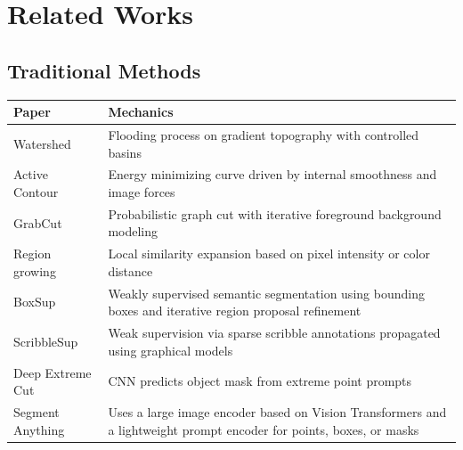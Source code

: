 \chapter{Related Works}
\label{Chapter2}
\section{Traditional Methods}
\begin{table}[H]
	\centering
	\begin{tabular}{|l|p{12cm}|}
		\hline
		{\textbf{Paper}} & {\textbf{Mechanics}} \\ \hline
		Watershed &
		Flooding process on gradient topography with controlled basins \\ \hline
		Active Contour &
		Energy minimizing curve driven by internal smoothness and image forces \\ \hline
		GrabCut &
		Probabilistic graph cut with iterative foreground background modeling \\ \hline
		Region growing &
		Local similarity expansion based on pixel intensity or color distance \\ \hline
		BoxSup           & Weakly supervised semantic segmentation using bounding boxes and iterative region proposal refinement                 \\ \hline
		ScribbleSup      & Weak supervision via sparse scribble annotations propagated using graphical models \\ \hline
		Deep Extreme Cut & CNN predicts object mask from extreme point prompts                                \\ \hline
		Segment Anything & Uses a large image encoder based on Vision Transformers and a lightweight prompt encoder for points, boxes, or masks \\ \hline
	\end{tabular}
\end{table}

